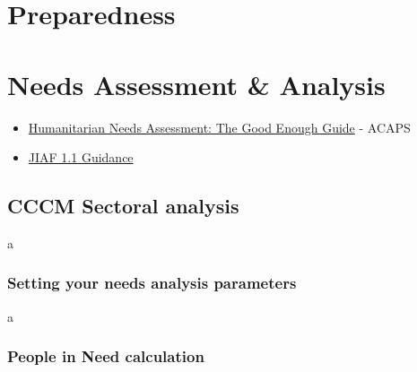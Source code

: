 \documentclass[
  a4paper,
  onecolumn,
  oneside]{book}
\providecommand{\tightlist}{%
  \setlength{\itemsep}{0pt}\setlength{\parskip}{0pt}}\usepackage{longtable,booktabs,array}
\begin{document}
\hypertarget{preparedness}{%
\chapter{Preparedness}\label{preparedness}}

\hypertarget{needs-assessment-analysis}{%
\chapter{Needs Assessment \& Analysis}\label{needs-assessment-analysis}}

\begin{tcolorbox}[enhanced jigsaw, leftrule=.75mm, arc=.35mm, breakable, toprule=.15mm, opacitybacktitle=0.6, title=\textcolor{quarto-callout-tip-color}{\faLightbulb}\hspace{0.5em}{Recommended reading}, toptitle=1mm, colframe=quarto-callout-tip-color-frame, left=2mm, opacityback=0, rightrule=.15mm, colback=white, coltitle=black, bottomrule=.15mm, colbacktitle=quarto-callout-tip-color!10!white, bottomtitle=1mm, titlerule=0mm]

\begin{itemize}
\tightlist
\item
  \href{files/humanitarian_needs_assessment-the_good_enough_guide_2014.pdf}{Humanitarian
  Needs Assessment: The Good Enough Guide} - ACAPS
\item
  \href{files/4.\%20HPC_2023-JIAF_Guide\%201.1.pdf}{JIAF 1.1 Guidance}
\end{itemize}

\end{tcolorbox}

\hypertarget{cccm-sectoral-analysis}{%
\section{CCCM Sectoral analysis}\label{cccm-sectoral-analysis}}

a

\hypertarget{setting-your-needs-analysis-parameters}{%
\subsection{Setting your needs analysis
parameters}\label{setting-your-needs-analysis-parameters}}

a

\hypertarget{people-in-need-calculation}{%
\subsection{People in Need
calculation}\label{people-in-need-calculation}}
\end{document}
